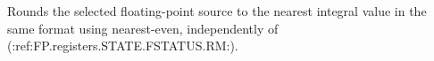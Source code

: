 Rounds the selected floating-point source to the nearest integral value in the same format using nearest-even, independently of (:ref:FP.registers.STATE.FSTATUS.RM:).
